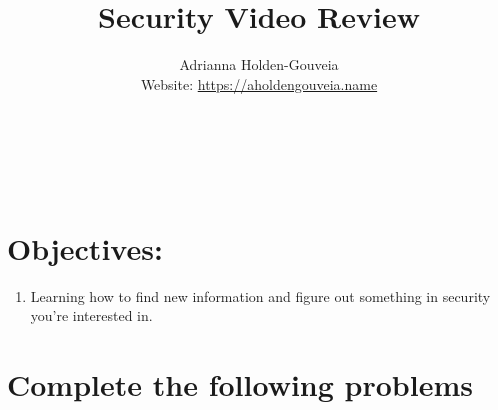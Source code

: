 \documentclass[12pt]{article}
\title{Security Video Review}
\author{
        Adrianna Holden-Gouveia \\
        Website: \url{https://aholdengouveia.name}\\ 
        \date{\vspace{-5ex}}
        \faLinkedin{: aholdengouveia} \\
        \faGithub {: aholdengouveia} \\
        \faTwitter {: aholdengouveia} \\
        }
\begin{document}
    

\maketitle

  
\section*{Objectives:}
\begin{enumerate}
    \item Learning how to find new information and figure out something in security you're interested in.
\end{enumerate}
\section*{Complete the following problems}

\end{document}
